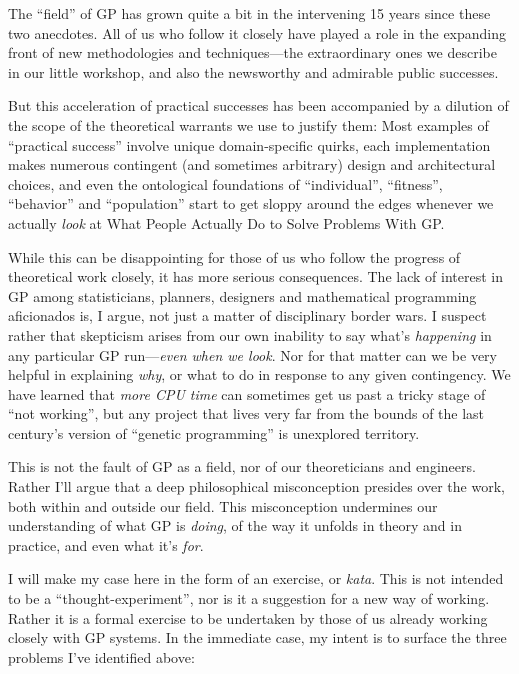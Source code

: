 The ``field'' of GP has grown quite a bit in the intervening 15 years since these two anecdotes. All of us who follow it closely have played a role in the expanding front of new methodologies and techniques---the extraordinary ones we describe in our little workshop, and also the newsworthy and admirable public successes.

But this acceleration of practical successes has been accompanied by a dilution of the scope of the theoretical warrants we use to justify them: Most examples of ``practical success'' involve unique domain-specific quirks, each implementation makes numerous contingent (and sometimes arbitrary) design and architectural choices, and even the ontological foundations of ``individual'', ``fitness'', ``behavior'' and ``population'' start to get sloppy around the edges whenever we actually \emph{look} at What People Actually Do to Solve Problems With GP.

While this can be disappointing for those of us who follow the progress of theoretical work closely, it has more serious consequences. The lack of interest in GP among statisticians, planners, designers and mathematical programming aficionados is, I argue, not just a matter of disciplinary border wars. I suspect rather that skepticism arises from our own inability to say what's \emph{happening} in any particular GP run---\emph{even when we look}. Nor for that matter can we be very helpful in explaining \emph{why}, or what to do in response to any given contingency. We have learned that \emph{more CPU time} can sometimes get us past a tricky stage of ``not working'', but any project that lives very far from the bounds of the last century's version of ``genetic programming'' is unexplored territory.

This is not the fault of GP as a field, nor of our theoreticians and engineers. Rather I'll argue that a deep philosophical misconception presides over the work, both within and outside our field. This misconception undermines our understanding of what GP is \emph{doing}, of the way it unfolds in theory and in practice, and even what it's \emph{for}.

I will make my case here in the form of an exercise, or \emph{kata}. This is not intended to be a ``thought-experiment'', nor is it a suggestion for a new way of working. Rather it is a formal exercise to be undertaken by those of us already working closely with GP systems. In the immediate case, my intent is to surface the three problems I've identified above:

